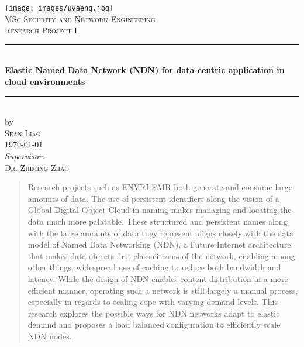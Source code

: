 \documentclass[letterpaper,12pt]{article}
\begin{document}
\begin{titlepage}

\newcommand{\HRule}{\rule{\linewidth}{0.5mm}}

\begin{center}
\texttt{[image: images/uvaeng.jpg]}\\[2.5cm]
\textsc{\Large MSc Security and Network Engineering}\\[0.2cm]
\textsc{\Large Research Project I}\\[0.5cm]

\HRule \\[0.4cm]
{\huge \bfseries Elastic Named Data Network (NDN) for data centric application in cloud environments}\\[0.4cm]
\HRule \\[0.5cm]

by\\[0.2cm]
\textsc{\Large Sean Liao}\\[0.2cm]

{\Large \today}\\[1cm]

\emph{Supervisor:} \\
\textsc{\Large Dr. Zhiming Zhao}

\vfill

\end{center}
\end{titlepage}




\begin{abstract}


Research projects such as ENVRI-FAIR both generate and consume large amounts of data. The use of persistent identifiers along the vision of a Global Digital Object Cloud in naming makes managing and locating the data much more palatable. These structured and persistent names along with the large amounts of data they represent aligns closely with the data model of Named Data Networking (NDN), a Future Internet architecture that makes data objects first class citizens of the network, enabling among other things, widespread use of caching to reduce both bandwidth and latency. While the design of NDN enables content distribution in a more efficient manner, operating such a network is still largely a manual process, especially in regards to scaling cope with varying demand levels. This research explores the possible ways for NDN networks adapt to elastic demand and proposes a load balanced configuration to efficiently scale NDN nodes.
\end{abstract}
\end{document}
